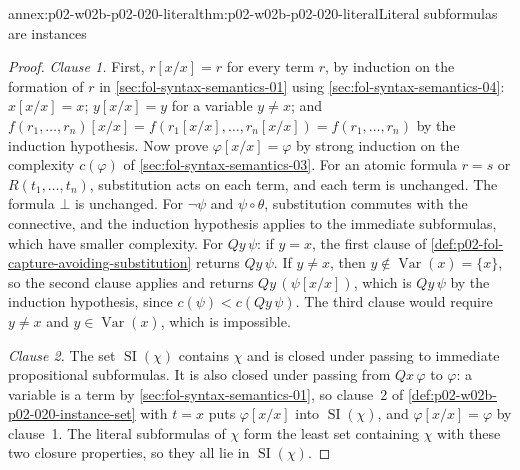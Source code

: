 \begin{annexitem}{annex:p02-w02b-p02-020-literal}{thm:p02-w02b-p02-020-literal}{Literal subformulas are instances}
\begin{proof}
\emph{Clause 1.}  First, \(r[x/x]=r\) for every term \(r\), by induction on
the formation of \(r\) in \cref{sec:fol-syntax-semantics-01} using
\cref{sec:fol-syntax-semantics-04}: \(x[x/x]=x\); \(y[x/x]=y\) for a
variable \(y\ne x\); and
\(f(r_1,\ldots,r_n)[x/x]=f(r_1[x/x],\ldots,r_n[x/x])=f(r_1,\ldots,r_n)\) by
the induction hypothesis.  Now prove \(\varphi[x/x]=\varphi\) by strong
induction on the complexity \(c(\varphi)\) of
\cref{sec:fol-syntax-semantics-03}.  For an atomic formula \(r=s\) or
\(R(t_1,\ldots,t_n)\), substitution acts on each term, and each term is
unchanged.  The formula \(\bot\) is unchanged.  For \(\neg\psi\) and
\(\psi\circ\theta\), substitution commutes with the connective, and the
induction hypothesis applies to the immediate subformulas, which have smaller
complexity.  For \(Qy\,\psi\): if \(y=x\), the first clause of
\cref{def:p02-fol-capture-avoiding-substitution} returns \(Qy\,\psi\).  If
\(y\ne x\), then \(y\notin\operatorname{Var}(x)=\{x\}\), so the second clause
applies and returns \(Qy\,(\psi[x/x])\), which is \(Qy\,\psi\) by the
induction hypothesis, since \(c(\psi)<c(Qy\,\psi)\).  The third clause would
require \(y\ne x\) and \(y\in\operatorname{Var}(x)\), which is impossible.

\emph{Clause 2.}  The set \(\operatorname{SI}(\chi)\) contains \(\chi\) and is
closed under passing to immediate propositional subformulas.  It is also closed
under passing from \(Qx\,\varphi\) to \(\varphi\): a variable is a term by
\cref{sec:fol-syntax-semantics-01}, so clause~2 of
\cref{def:p02-w02b-p02-020-instance-set} with \(t=x\) puts
\(\varphi[x/x]\) into \(\operatorname{SI}(\chi)\), and
\(\varphi[x/x]=\varphi\) by clause~1.  The literal subformulas of \(\chi\)
form the least set containing \(\chi\) with these two closure properties, so
they all lie in \(\operatorname{SI}(\chi)\).


\end{proof}
\end{annexitem}
